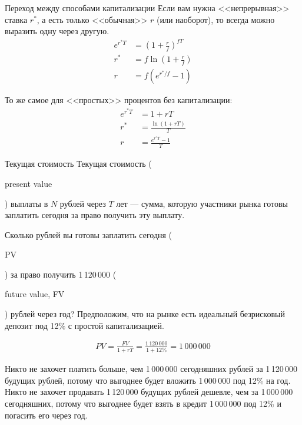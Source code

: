 \documentclass{beamer}
\newcommand{\en}[1]{\begin{otherlanguage}{english}#1\end{otherlanguage}}
\begin{document}
\begin{frame}{Переход между способами капитализации}
\justify
Если вам нужна <<непрерывная>> ставка $r^*$, а есть только <<обычная>> $r$ (или наоборот), то всегда можно выразить одну через другую.
\begin{align*}
e^{r^*T} &= \left(1 + \frac{r}{f}\right)^{fT} \\
r^* &= f\ln \left(1 + \frac{r}{f}\right) \\
r &= f\left(e^{r^*/f} - 1\right)
\end{align*}

\justify
То же самое для <<простых>> процентов без капитализации:
\begin{align*}
e^{r^*T} &= 1+rT \\
r^* &= \frac{\ln(1+rT)}{T} \\
r &= \frac{e^{r^*T}-1}{T}
\end{align*}

\end{frame}



\begin{frame}{Текущая стоимость}
\justify
\alert{Текущая стоимость} (\en{present value}) выплаты в $N$ рублей через $T$ лет --- сумма, 
которую участники рынка готовы заплатить сегодня за право получить эту выплату.

\justify
Сколько рублей вы готовы заплатить сегодня (\en{PV}) за право получить 1\,120\,000 (\en{future value, FV}) рублей через год? Предположим, что на рынке есть идеальный безрисковый депозит под 12\% с простой капитализацией.

\begin{align*}
PV = \frac{FV}{1+rT} = \frac{1\,120\,000}{1 + 12\%} = 1\,000\,000
\end{align*}

\justify
Никто не захочет платить больше, чем 1\,000\,000 сегодняшних рублей за 1\,120\,000 будущих рублей, потому что выгоднее будет вложить 1\,000\,000 под 12\% на год. Никто не захочет продавать 1\,120\,000 будущих рублей дешевле, чем за 1\,000\,000 сегодняшних, потому что выгоднее будет взять в кредит 1\,000\,000 под 12\% и погасить его через год.
\end{frame}
\end{document}
